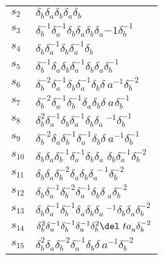 \documentclass{article}
\begin{document}
\begin{center}
\begin{tabular}{ll}
$s_{2}$ & $\delta_b^{}\delta_a^{}\delta_b^{}\delta_a^{}\delta_b^{}$ \\
$s_{3}$ & $\delta_b^{-1}\delta_a^{-1}\delta_b^{}\delta_a^{}\delta_b^{}\delta_a^\
{-1}\delta_b^{-1}$ \\
$s_{4}$ & $\delta_b^{}\delta_a^{-1}\delta_b^{}\delta_a^{-1}\delta_b^{}$ \\
$s_{5}$ & $\delta_b^{-1}\delta_a^{}\delta_b^{}\delta_a^{-1}\delta_b^{}\delta_a^\
{}\delta_b^{-1}$ \\
$s_{6}$ & $\delta_b^{-2}\delta_a^{-1}\delta_b^{}\delta_a^{-1}\delta_b^{}\delta_\
a^{-1}\delta_b^{-2}$ \\
$s_{7}$ & $\delta_b^{-2}\delta_a^{-1}\delta_b^{-1}\delta_a^{}\delta_b^{}\delta_\
a^{}\delta_b^{-1}$ \\
$s_{8}$ & $\delta_b^{2}\delta_a^{-1}\delta_b^{}\delta_a^{-1}\delta_b^{}\delta_a\
^{-1}\delta_b^{-1}$ \\
$s_{9}$ & $\delta_b^{-2}\delta_a^{}\delta_b^{-1}\delta_a^{-1}\delta_b^{}\delta_\
a^{-1}\delta_b^{-1}$ \\
$s_{10}$ & $\delta_b^{}\delta_a^{}\delta_b^{-1}\delta_a^{-1}\delta_b^{}\delta_a\
^{}\delta_b^{}\delta_a^{-1}\delta_b^{-2}$ \\
$s_{11}$ & $\delta_b^{}\delta_a^{}\delta_b^{-2}\delta_a^{}\delta_b^{}\delta_a^{\
-1}\delta_b^{-2}$ \\
$s_{12}$ & $\delta_b^{}\delta_a^{-1}\delta_b^{-2}\delta_a^{-1}\delta_b^{}\delta\
_a^{}\delta_b^{-2}$ \\
$s_{13}$ & $\delta_b^{}\delta_a^{-1}\delta_b^{-1}\delta_a^{}\delta_b^{}\delta_a\
^{-1}\delta_b^{}\delta_a^{}\delta_b^{-2}$ \\
$s_{14}$ & $\delta_b^{2}\delta_a^{-1}\delta_b^{-1}\delta_a^{-1}\delta_b^{2}\del\
ta_a^{}\delta_b^{-2}$ \\
$s_{15}$ & $\delta_b^{2}\delta_a^{}\delta_b^{-2}\delta_a^{-1}\delta_b^{}\delta_\
a^{-1}\delta_b^{-2}$ \\
\bottomrule
\end{tabular}
\end{center}

\thispagestyle{empty}
\end{document}
